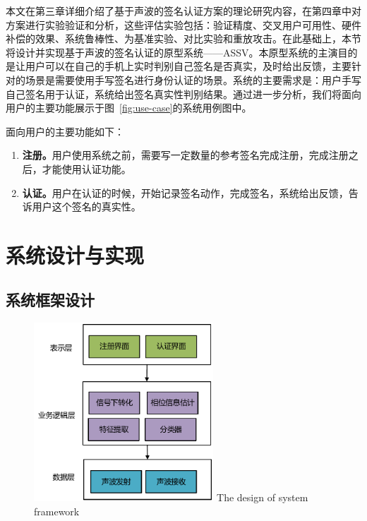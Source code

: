 本文在第三章详细介绍了基于声波的签名认证方案的理论研究内容，在第四章中对方案进行实验验证和分析，这些评估实验包括：验证精度、交叉用户可用性、硬件补偿的效果、系统鲁棒性、为基准实验、对比实验和重放攻击。在此基础上，本节将设计并实现基于声波的签名认证的原型系统——ASSV。本原型系统的主演目的是让用户可以在自己的手机上实时判别自己签名是否真实，及时给出反馈，主要针对的场景是需要使用手写签名进行身份认证的场景。系统的主要需求是：用户手写自己签名用于认证，系统给出签名真实性判别结果。通过进一步分析，我们将面向用户的主要功能展示于图~\ref{fig:use-case}的系统用例图中。

面向用户的主要功能如下：
\begin{enumerate}[label=(\arabic*)]
    \item \textbf{注册。}用户使用系统之前，需要写一定数量的参考签名完成注册，完成注册之后，才能使用认证功能。
    \item \textbf{认证。}用户在认证的时候，开始记录签名动作，完成签名，系统给出反馈，告诉用户这个签名的真实性。
\end{enumerate}


\section{系统设计与实现}
\subsection{系统框架设计}

\begin{figure}
  \centering
  \includegraphics[width=0.6\textwidth]{figure/prototype-architecture.pdf}
      {The design of system framework}
  \label{fig:system-framework}
\end{figure}

